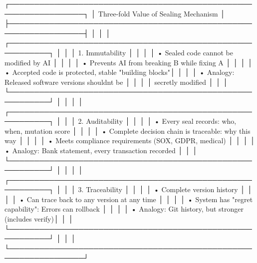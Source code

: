 \documentclass[
]{article}
\newenvironment{Shaded}{}{}
\newcommand{\NormalTok}[1]{#1}
\begin{document}
\begin{Shaded}
\begin{Highlighting}[]
\NormalTok{┌─────────────────────────────────────────────────────────────────┐}
\NormalTok{│               Three{-}fold Value of Sealing Mechanism              │}
\NormalTok{├─────────────────────────────────────────────────────────────────┤}
\NormalTok{│                                                                  │}
\NormalTok{│  ┌──────────────────────────────────────────────────────────┐   │}
\NormalTok{│  │ 1. Immutability                                          │   │}
\NormalTok{│  │    • Sealed code cannot be modified by AI                │   │}
\NormalTok{│  │    • Prevents AI from breaking B while fixing A          │   │}
\NormalTok{│  │    • Accepted code is protected, stable "building blocks"│   │}
\NormalTok{│  │    • Analogy: Released software versions shouldn\textquotesingle{}t be    │   │}
\NormalTok{│  │              secretly modified                            │   │}
\NormalTok{│  └──────────────────────────────────────────────────────────┘   │}
\NormalTok{│                                                                  │}
\NormalTok{│  ┌──────────────────────────────────────────────────────────┐   │}
\NormalTok{│  │ 2. Auditability                                          │   │}
\NormalTok{│  │    • Every seal records: who, when, mutation score       │   │}
\NormalTok{│  │    • Complete decision chain is traceable: why this way  │   │}
\NormalTok{│  │    • Meets compliance requirements (SOX, GDPR, medical)  │   │}
\NormalTok{│  │    • Analogy: Bank statement, every transaction recorded │   │}
\NormalTok{│  └──────────────────────────────────────────────────────────┘   │}
\NormalTok{│                                                                  │}
\NormalTok{│  ┌──────────────────────────────────────────────────────────┐   │}
\NormalTok{│  │ 3. Traceability                                          │   │}
\NormalTok{│  │    • Complete version history                            │   │}
\NormalTok{│  │    • Can trace back to any version at any time           │   │}
\NormalTok{│  │    • System has "regret capability": Errors can rollback │   │}
\NormalTok{│  │    • Analogy: Git history, but stronger (includes verify)│   │}
\NormalTok{│  └──────────────────────────────────────────────────────────┘   │}
\NormalTok{│                                                                  │}
\NormalTok{└─────────────────────────────────────────────────────────────────┘}
\end{Highlighting}
\end{Shaded}
\end{document}

